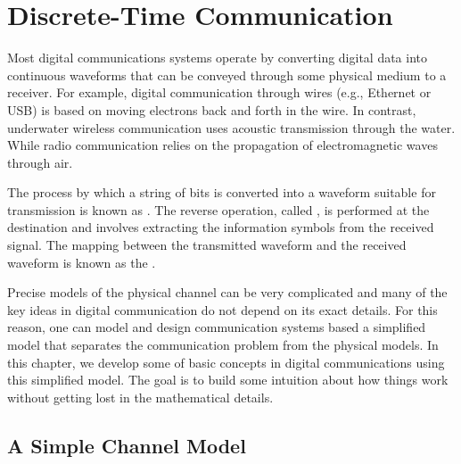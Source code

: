 \chapter{Discrete-Time Communication}
\label{chapter:DiscreteTimeComm}

Most digital communications systems operate by converting digital data into continuous waveforms that can be conveyed through some physical medium to a receiver.
For example, digital communication through wires (e.g., Ethernet or USB) is based on moving electrons back and forth in the wire.
In contrast, underwater wireless communication uses acoustic transmission through the water.
While radio communication relies on the propagation of electromagnetic waves through air.

The process by which a string of bits is converted into a waveform suitable for transmission is known as .
The reverse operation, called , is performed at the destination and involves extracting the information symbols from the received signal.
The mapping between the transmitted waveform and the received waveform is known as the .

Precise models of the physical channel can be very complicated and many of the key ideas in digital communication do not depend on its exact details.
For this reason, one can model and design communication systems based a simplified model that separates the communication problem from the physical models.
In this chapter, we develop some of basic concepts in digital communications using this simplified model.
The goal is to build some intuition about how things work without getting lost in the mathematical details.

\section{A Simple Channel Model}

